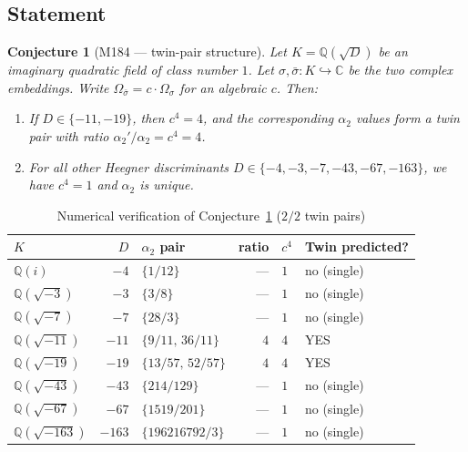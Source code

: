 \documentclass[12pt]{amsart}
\newtheorem{conjecture}[theorem]{Conjecture}
\theoremstyle{definition}
\newcommand{\Q}{\mathbb{Q}}
\newcommand{\C}{\mathbb{C}}
\newcommand{\Omega}{\varOmega}
\begin{document}
\subsection{Statement}

\begin{conjecture}[M184 --- twin-pair structure]
  \label{conj:M184}
  Let $K = \Q(\sqrt{D})$ be an imaginary quadratic field of class number $1$.
  Let $\sigma, \bar\sigma : K \hookrightarrow \C$ be the two complex embeddings.
  Write $\Omega_{\bar\sigma} = c \cdot \Omega_\sigma$ for an algebraic $c$.
  Then:
  \begin{enumerate}
    \item If $D \in \{-11, -19\}$, then $c^4 = 4$, and the corresponding
      $\alpha_2$ values form a twin pair with ratio $\alpha_2'/\alpha_2 = c^4 = 4$.
    \item For all other Heegner discriminants
      $D \in \{-4, -3, -7, -43, -67, -163\}$, we have $c^4 = 1$
      and $\alpha_2$ is unique.
  \end{enumerate}
\end{conjecture}

\begin{table}[h]
  \caption{Numerical verification of Conjecture~\ref{conj:M184} ($2/2$ twin pairs)}
  \label{tab:M184}
  \renewcommand{\arraystretch}{1.25}
  \begin{tabular}{lrlrll}
    \toprule
    $K$ & $D$ & $\alpha_2$ pair & ratio & $c^4$ & Twin predicted? \\
    \midrule
    $\Q(i)$          & $-4$   & $\{1/12\}$         & ---   & $1$   & no (single) \\
    $\Q(\sqrt{-3})$  & $-3$   & $\{3/8\}$          & ---   & $1$   & no (single) \\
    $\Q(\sqrt{-7})$  & $-7$   & $\{28/3\}$         & ---   & $1$   & no (single) \\
    $\Q(\sqrt{-11})$ & $-11$  & $\{9/11,\,36/11\}$ & $4$   & $4$   & YES \\
    $\Q(\sqrt{-19})$ & $-19$  & $\{13/57,\,52/57\}$& $4$   & $4$   & YES \\
    $\Q(\sqrt{-43})$ & $-43$  & $\{214/129\}$      & ---   & $1$   & no (single) \\
    $\Q(\sqrt{-67})$ & $-67$  & $\{1519/201\}$     & ---   & $1$   & no (single) \\
    $\Q(\sqrt{-163})$& $-163$ & $\{196216792/3\}$  & ---   & $1$   & no (single) \\
    \bottomrule
  \end{tabular}
\end{table}
\end{document}

